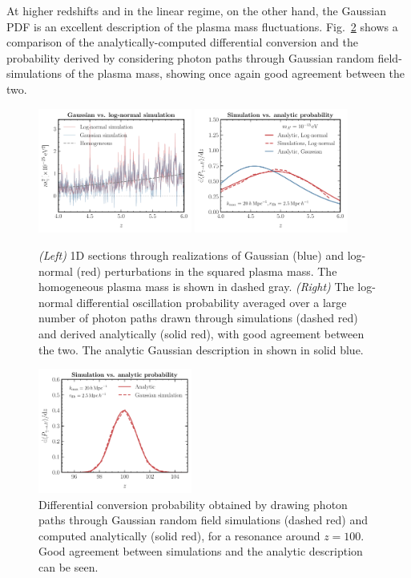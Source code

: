 \documentclass[prd,aps,10pt,nofootinbib,twocolumn,superscriptaddress,preprintnumbers,balancelastpage,longbibliography]{revtex4-1}
\begin{document}
At higher redshifts and in the linear regime, on the other hand, the Gaussian PDF is an excellent description of the plasma mass fluctuations. Fig.~\ref{fig:dPdz_GRF_sim} shows a comparison of the analytically-computed differential conversion and the probability derived by considering photon paths through Gaussian random field-simulations of the plasma mass, showing once again good agreement between the two. 

%
\begin{figure}[htbp]
    \centering
    \includegraphics[width=0.45\textwidth]{plots/m_gamma_sq_LN_sims}
    \includegraphics[width=0.45\textwidth]{plots/dPdz_LN_sims}
    \caption{\emph{(Left)} 1D sections through realizations of Gaussian (blue) and log-normal (red) perturbations in the squared plasma mass. The homogeneous plasma mass is shown in dashed gray. \emph{(Right)} The log-normal differential oscillation probability averaged over a large number of photon paths drawn through simulations (dashed red) and derived analytically (solid red), with good agreement between the two. The analytic Gaussian description in shown in solid blue.~} 
    \label{fig:plasma_sims}
\end{figure}
%

%
\begin{figure}[htbp]
    \centering
    \includegraphics[width=0.45\textwidth]{plots/dPdz_GRF_sim}
    \caption{Differential conversion probability obtained by drawing photon paths through Gaussian random field simulations (dashed red) and computed analytically (solid red), for a resonance around $z=100$. Good agreement between simulations and the analytic description can be seen.~} 
    \label{fig:dPdz_GRF_sim}
\end{figure}
%
\end{document}
